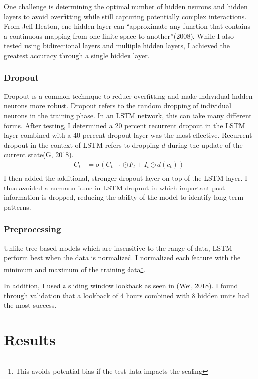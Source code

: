 \documentclass[12pt,twoside]{dukestatscithesis}
\begin{document}
One challenge is determining the optimal number of hidden neurons and
hidden layers to avoid overfitting while still capturing potentially
complex interactions. From Jeff Heaton, one hidden layer can
``approximate any function that contains a continuous mapping from one
finite space to another''(2008). While I also tested using bidirectional
layers and multiple hidden layers, I achieved the greatest accuracy
through a single hidden layer.

\subsection{Dropout}\label{dropout}

Dropout is a common technique to reduce overfitting and make individual
hidden neurons more robust. Dropout refers to the random dropping of
individual neurons in the training phase. In an LSTM network, this can
take many different forms. After testing, I determined a 20 percent
recurrent dropout in the LSTM layer combined with a 40 percent dropout
layer was the most effective. Recurrent dropout in the context of LSTM
refers to dropping \(d\) during the update of the current state(G,
2018).
\begin{align}
  C_t &= \sigma(C_{t-1}\odot F_t + I_t\odot d(c_t)) \label{eq:12} \\ 
\end{align}
I then added the additional, stronger dropout layer on top of the LSTM
layer. I thus avoided a common issue in LSTM dropout in which important
past information is dropped, reducing the ability of the model to
identify long term patterns.

\subsection{Preprocessing}\label{preprocessing}

Unlike tree based models which are insensitive to the range of data,
LSTM perform best when the data is normalized. I normalized each feature
with the minimum and maximum of the training data\footnote{This avoids
  potential bias if the test data impacts the scaling}.

In addition, I used a sliding window lookback as seen in (Wei, 2018). I
found through validation that a lookback of 4 hours combined with 8
hidden units had the most success.

\chapter{Results}\label{results}
\end{document}
